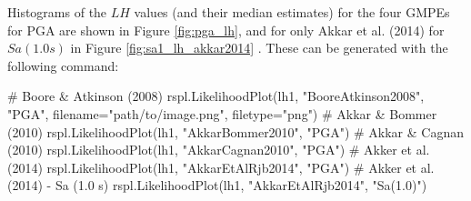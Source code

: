 Histograms of the $LH$ values (and their median estimates) for the four GMPEs for PGA are shown in Figure \ref{fig:pga_lh}, and for only Akkar et al. (2014) for $Sa \left( {1.0 s} \right)$ in Figure \ref{fig:sa1_lh_akkar2014} . These can be generated with the following command:

\begin{python}
# Boore & Atkinson (2008)
rspl.LikelihoodPlot(lh1, "BooreAtkinson2008", "PGA",
                    filename="path/to/image.png",
                    filetype="png")
# Akkar & Bommer (2010)
rspl.LikelihoodPlot(lh1, "AkkarBommer2010", "PGA")
# Akkar & Cagnan (2010)
rspl.LikelihoodPlot(lh1, "AkkarCagnan2010", "PGA")
# Akker et al. (2014)
rspl.LikelihoodPlot(lh1, "AkkarEtAlRjb2014", "PGA")
# Akker et al. (2014) - Sa (1.0 s)
rspl.LikelihoodPlot(lh1, "AkkarEtAlRjb2014", "Sa(1.0)")
\end{python}

